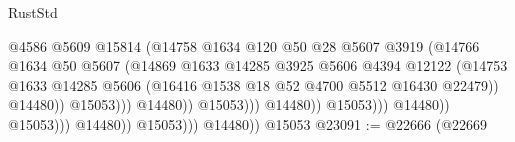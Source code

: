 \begin{lexlean}{RustStd}
\begin{coremodule}
                                                    @4586
                                                    @5609
                                                    @15814
                                                    (@14758
                                                      @1634
                                                      @120
                                                      @50
                                                      @28
                                                      @5607
                                                      @3919
                                                      (@14766
                                                        @1634
                                                        @50
                                                        @5607
                                                        (@14869
                                                          @1633
                                                          @14285
                                                          @3925
                                                          @5606
                                                          @4394
                                                          @12122
                                                          (@14753
                                                            @1633
                                                            @14285
                                                            @5606
                                                            (@16416
                                                              @1538
                                                              @18
                                                              @52
                                                              @4700
                                                              @5512
                                                              @16430
                                                              @22479))
                                                          @14480))
                                                      @15053)))
                                                @14480))
                                            @15053)))
                                      @14480))
                                  @15053)))
                            @14480))
                        @15053)))
                  @14480))
              @15053)))
        @14480))
    @15053
@23091 := @22666
    (@22669

\end{coremodule}
\end{lexlean}
